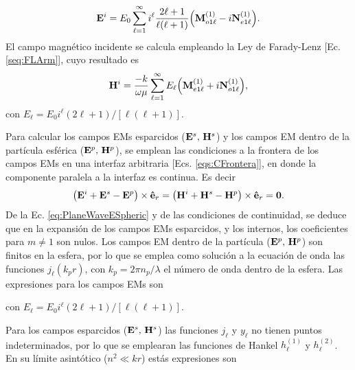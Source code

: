 	\begin{equation}
	\vb{E}^i = E_0 \sum_{\ell =1}^\infty i^\ell \frac{2\ell+1}{\ell(\ell+1)}\qty(\vb{M}_{o1\ell}^{(1)}-i\vb{N}_{e1\ell}^{(1)}).
	\label{eq:PlaneWaveESpheric}
	\end{equation}
El campo magnético incidente se calcula empleando la Ley de Farady-Lenz [Ec. \eqref{seq:FLArm}], cuyo resultado es
	\begin{equation}
	\vb{H}^i =\frac{-k}{\omega\mu} \sum_{\ell =1}^\infty  E_\ell\qty(\vb{M}_{e1\ell}^{(1)}+i\vb{N}_{o1\ell}^{(1)}),
	\label{eq:PlaneWaveHSpheric}
	\end{equation}
con $E_\ell = E_0 i^\ell (2\ell+1)/[\ell(\ell+1)]$.







Para calcular los campos EMs esparcidos ($\vb{E}^s,\,\vb{H}^s$) y los campos EM dentro de la partícula esférica ($\vb{E}^p,\,\vb{H}^p$), se emplean las condiciones a la frontera de los campos EMs en una interfaz arbitraria [Ecs. \eqref{eqs:CFrontera}], en donde la componente paralela a la interfaz es continua. Es decir
	\begin{align}
	\qty(\vb{E}^i+\vb{E}^s -\vb{E}^p)\times\vu{e}_r =
	\qty(\vb{H}^i+\vb{H}^s -\vb{H}^p)\times\vu{e}_r = \vb{0}.
	\end{align}
De la Ec. \eqref{eq:PlaneWaveESpheric} y de las condiciones de continuidad, se deduce que en la expansión de los campos EMs esparcidos, y los internos, los coeficientes para $m\neq 1$ son nulos. Los campos EM dentro de la partícula ($\vb{E}^p,\,\vb{H}^p$) son finitos en la esfera, por lo que se emplea como solución a la ecuación de onda las funciones $j_\ell(k_p r)$, con $k_p = 2\pi n_p /\lambda$ el número de onda dentro de la esfera. Las expresiones para los campos EMs son
	

\vspace*{-1em}\noindent
con $E_\ell =E _0 i^\ell (2\ell+1)/[\ell(\ell+1)]$.

Para los campos esparcidos ($\vb{E}^s,\,\vb{H}^s$) las funciones $j_\ell$ y $y_\ell$ no tienen puntos indeterminados, por lo que se emplearan las funciones de Hankel $h_\ell^{(1)}$ y $h_\ell^{(2)}$. En su límite asintótico ($n^2\ll kr$) estás expresiones son

